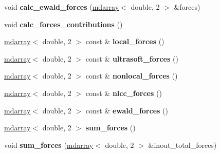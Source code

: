 \begin{DoxyCompactItemize}
\item 
\hypertarget{classsirius_1_1_forces___p_s_ad2a6d364623a6d026a5703a574747322}{}void {\bfseries calc\+\_\+ewald\+\_\+forces} (\hyperlink{classsddk_1_1mdarray}{mdarray}$<$ double, 2 $>$ \&forces)\label{classsirius_1_1_forces___p_s_ad2a6d364623a6d026a5703a574747322}

\item 
\hypertarget{classsirius_1_1_forces___p_s_aa1f806cff8d05eb38fb4943a6f969c4c}{}void {\bfseries calc\+\_\+forces\+\_\+contributions} ()\label{classsirius_1_1_forces___p_s_aa1f806cff8d05eb38fb4943a6f969c4c}

\item 
\hypertarget{classsirius_1_1_forces___p_s_a8c1517d63b0652f10331326c59f78bb4}{}\hyperlink{classsddk_1_1mdarray}{mdarray}$<$ double, 2 $>$ const \& {\bfseries local\+\_\+forces} ()\label{classsirius_1_1_forces___p_s_a8c1517d63b0652f10331326c59f78bb4}

\item 
\hypertarget{classsirius_1_1_forces___p_s_a79f55038dc773315b02537a1281aff9c}{}\hyperlink{classsddk_1_1mdarray}{mdarray}$<$ double, 2 $>$ const \& {\bfseries ultrasoft\+\_\+forces} ()\label{classsirius_1_1_forces___p_s_a79f55038dc773315b02537a1281aff9c}

\item 
\hypertarget{classsirius_1_1_forces___p_s_ae2bc2df9c9a07b867a8c89060639fb27}{}\hyperlink{classsddk_1_1mdarray}{mdarray}$<$ double, 2 $>$ const \& {\bfseries nonlocal\+\_\+forces} ()\label{classsirius_1_1_forces___p_s_ae2bc2df9c9a07b867a8c89060639fb27}

\item 
\hypertarget{classsirius_1_1_forces___p_s_add69a3255c12cf94f3dfc0050bf8a054}{}\hyperlink{classsddk_1_1mdarray}{mdarray}$<$ double, 2 $>$ const \& {\bfseries nlcc\+\_\+forces} ()\label{classsirius_1_1_forces___p_s_add69a3255c12cf94f3dfc0050bf8a054}

\item 
\hypertarget{classsirius_1_1_forces___p_s_a6cc3c64a16bbf44e4a426d7a8e7a9878}{}\hyperlink{classsddk_1_1mdarray}{mdarray}$<$ double, 2 $>$ const \& {\bfseries ewald\+\_\+forces} ()\label{classsirius_1_1_forces___p_s_a6cc3c64a16bbf44e4a426d7a8e7a9878}

\item 
\hypertarget{classsirius_1_1_forces___p_s_aa754f702d2b53104396696f09a2c44d6}{}\hyperlink{classsddk_1_1mdarray}{mdarray}$<$ double, 2 $>$ {\bfseries sum\+\_\+forces} ()\label{classsirius_1_1_forces___p_s_aa754f702d2b53104396696f09a2c44d6}

\item 
\hypertarget{classsirius_1_1_forces___p_s_a5b84c30a8ba2d3ca0ec0c1e89c4600dc}{}void {\bfseries sum\+\_\+forces} (\hyperlink{classsddk_1_1mdarray}{mdarray}$<$ double, 2 $>$ \&inout\+\_\+total\+\_\+forces)\label{classsirius_1_1_forces___p_s_a5b84c30a8ba2d3ca0ec0c1e89c4600dc}

\end{DoxyCompactItemize}
